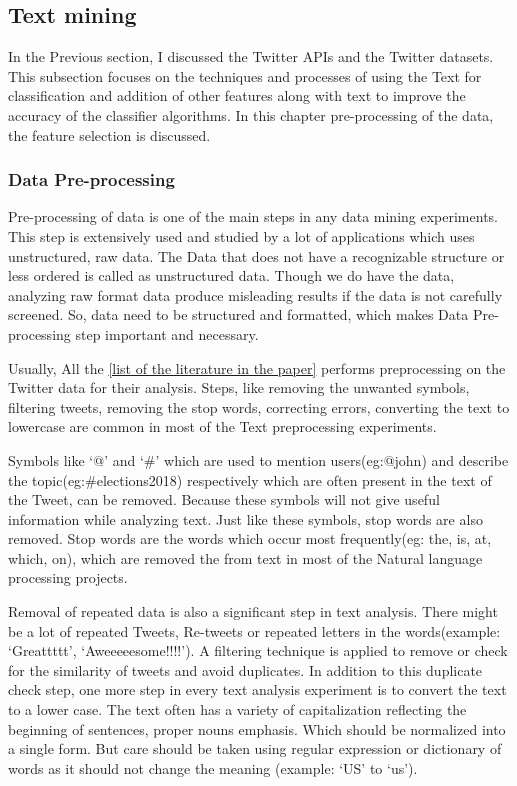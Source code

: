  
\subsection{Text mining}

In the Previous section, I discussed the Twitter APIs and the Twitter datasets. This subsection focuses on the techniques and processes of using the Text for classification and addition of other features along with text to improve the accuracy of the classifier algorithms.  In this chapter pre-processing of the data, the feature selection is discussed.

\subsubsection{Data Pre-processing}

Pre-processing of data is one of the main steps in any data mining experiments. This step is extensively used and studied by a lot of applications which uses unstructured, raw data. The Data that does not have a recognizable structure or less ordered is called as unstructured data.  Though we do have the data, analyzing raw format data produce misleading results if the data is not carefully screened. So, data need to be structured and formatted, which makes Data Pre-processing step important and necessary.

Usually, All the \underline{[list of the literature in the paper]} performs preprocessing on the Twitter data for their analysis. Steps,  like removing the unwanted symbols, filtering tweets, removing the stop words,  correcting errors, converting the text to lowercase are common in most of the Text preprocessing experiments.

Symbols like `@' and `\#' which are used to mention users(eg:@john) and describe the topic(eg:\#elections2018) respectively which are often present in the text of the Tweet, can be removed. Because these symbols will not give useful information while analyzing text. Just like these symbols, stop words are also removed. Stop words are the words which occur most frequently(eg: the, is, at, which, on), which are removed the from text in most of the Natural language processing projects. 

Removal of repeated data is also a significant step in text analysis. There might be a lot of repeated Tweets, Re-tweets or repeated letters in the words(example: `Greattttt', `Aweeeeesome!!!!'). A filtering technique is applied to remove or check for the similarity of tweets and avoid duplicates. In addition to this duplicate check step, one more step in every text analysis experiment is to convert the text to a lower case. The text often has a variety of capitalization reflecting the beginning of sentences, proper nouns emphasis. Which should be normalized into a single form. But care should be taken using regular expression or dictionary of words as it should not change the meaning (example: `US' to `us').

